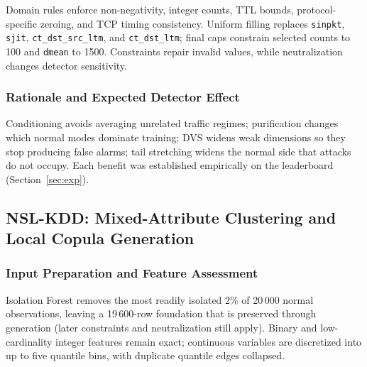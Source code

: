 \documentclass[10pt,a4paper]{article}
\begin{document}
Domain rules enforce non-negativity, integer counts, TTL bounds, protocol-specific zeroing, and TCP timing consistency. Uniform filling replaces \texttt{sinpkt}, \texttt{sjit}, \texttt{ct\_\allowbreak dst\_\allowbreak src\_\allowbreak ltm}, and \texttt{ct\_\allowbreak dst\_\allowbreak ltm}; final caps constrain selected counts to 100 and \texttt{dmean} to 1500. Constraints repair invalid values, while neutralization changes detector sensitivity.
\subsubsection{Rationale and Expected Detector Effect}
Conditioning avoids averaging unrelated traffic regimes; purification changes which normal modes dominate training; DVS widens weak dimensions so they stop producing false alarms; tail stretching widens the normal side that attacks do not occupy. Each benefit was established empirically on the leaderboard (Section~\ref{sec:exp}).

\subsection{NSL-KDD: Mixed-Attribute Clustering and Local Copula Generation}
\subsubsection{Input Preparation and Feature Assessment}
Isolation Forest removes the most readily isolated 2\% of 20\,000 normal observations, leaving a 19\,600-row foundation that is preserved through generation (later constraints and neutralization still apply). Binary and low-cardinality integer features remain exact; continuous variables are discretized into up to five quantile bins, with duplicate quantile edges collapsed.
\end{document}

